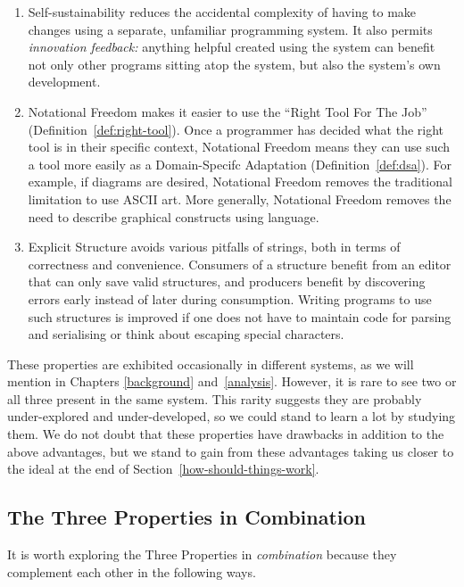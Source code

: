 \documentclass[ twoside,openright,titlepage,numbers=noenddot,headinclude,footinclude,cleardoublepage=empty,abstract=on,
                BCOR=5mm,paper=a4,fontsize=11pt
                ]{scrreprt}
\newcommand{\RTFJ}{Right Tool For The Job}
\providecommand{\tightlist}{}\newenvironment{longtable}[2]{\begin{tabular}}{\end{tabular}}
\theoremstyle{definition}
\begin{document}
\begin{enumerate}
\def\labelenumi{\arabic{enumi}.}
\tightlist
\item
  Self-sustainability reduces the accidental complexity of having to
  make changes using a separate, unfamiliar programming system. It also
  permits \emph{innovation feedback:} anything helpful created using the
  system can benefit not only other programs sitting atop the system,
  but also the system's own development.
\item
  Notational Freedom makes it easier to use the ``\RTFJ''
  (Definition~\ref{def:right-tool}). Once a programmer has decided what
  the right tool is in their specific context, Notational Freedom means
  they can use such a tool more easily as a Domain-Specifc Adaptation
  (Definition~\ref{def:dsa}). For example, if diagrams are desired,
  Notational Freedom removes the traditional limitation to use ASCII
  art. More generally, Notational Freedom removes the need to describe
  graphical constructs using language.
\item
  Explicit Structure avoids various pitfalls of strings, both in terms
  of correctness and convenience. Consumers of a structure benefit from
  an editor that can only save valid structures, and producers benefit
  by discovering errors early instead of later during consumption.
  Writing programs to use such structures is improved if one does not
  have to maintain code for parsing and serialising or think about
  escaping special characters.
\end{enumerate}

These properties are exhibited occasionally in different systems, as we
will mention in Chapters \ref{background} and~\ref{analysis}. However,
it is rare to see two or all three present in the same system. This
rarity suggests they are probably under-explored and under-developed, so
we could stand to learn a lot by studying them. We do not doubt that
these properties have drawbacks in addition to the above advantages, but
we stand to gain from these advantages taking us closer to the ideal at
the end of Section~\ref{how-should-things-work}.

\hypertarget{the-three-properties-in-combination}{\subsection{The Three Properties in
Combination}\label{the-three-properties-in-combination}}

It is worth exploring the Three Properties in \emph{combination} because
they complement each other in the following ways.
\end{document}
